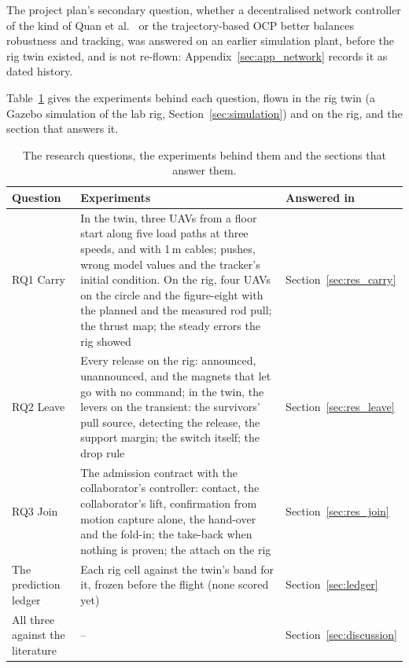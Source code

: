 The project plan's secondary question, whether a decentralised network controller of the kind of Quan et
al.\ \cite{quan2025swarm} or the trajectory-based OCP \cite{tudelft} better balances robustness and tracking, was
answered on an earlier simulation plant, before the rig twin existed, and is not re-flown:
Appendix~\ref{sec:app_network} records it as dated history.

Table~\ref{tab:rq_map} gives the experiments behind each question, flown in the rig twin (a Gazebo simulation
of the lab rig, Section~\ref{sec:simulation}) and on the rig, and the section that answers it.

\begin{table}[h]
\centering
\small
\caption{The research questions, the experiments behind them and the sections that answer them.}
\label{tab:rq_map}
\begin{tabularx}{\textwidth}{>{\raggedright\arraybackslash}p{2.6cm}>{\raggedright\arraybackslash}Xl}
\toprule
Question & Experiments & Answered in \\
\midrule
RQ1 Carry & In the twin, three UAVs from a floor start along five load paths at three speeds, and with 1\,m
cables; pushes, wrong model values and the tracker's initial condition. On the rig, four UAVs on the circle and
the figure-eight with the planned and the measured rod pull; the thrust map; the steady errors the rig showed &
Section~\ref{sec:res_carry} \\
\addlinespace
RQ2 Leave & Every release on the rig: announced, unannounced, and the magnets that let go with no command; in the
twin, the levers on the transient: the survivors' pull source, detecting the release, the support margin; the
switch itself; the drop rule & Section~\ref{sec:res_leave} \\
\addlinespace
RQ3 Join & The admission contract with the collaborator's controller: contact, the collaborator's lift,
confirmation from motion capture alone, the hand-over and the fold-in; the take-back when nothing is proven; the
attach on the rig & Section~\ref{sec:res_join} \\
\addlinespace
The prediction ledger & Each rig cell against the twin's band for it, frozen before the flight (none scored yet) &
Section~\ref{sec:ledger} \\
\addlinespace
All three against the literature & -- & Section~\ref{sec:discussion} \\
\bottomrule
\end{tabularx}
\end{table}

